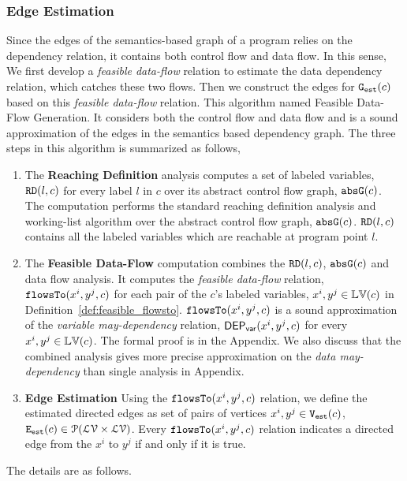 \subsubsection{Edge Estimation}
\label{sec:alg_edgegen}
Since the edges of the semantics-based graph of a program relies on the dependency relation, it contains both control flow and data flow. 
In this sense, We first develop a \emph{feasible data-flow} relation to estimate the data dependency relation, which catches these two flows.
Then we construct the edges for $\mathtt{{G_{est}}}(c)$ based on this \emph{feasible data-flow} relation.
This algorithm named Feasible Data-Flow Generation. It 
considers both the control flow and data flow and
is a sound approximation of the edges in the semantics based dependency graph.
The three steps in this algorithm is summarized as follows,
\begin{enumerate}
  \item The \textbf{Reaching Definition} analysis computes a set of labeled variables, $\mathtt{RD}(l, c)$ for every label $l$ in $c$
  over its abstract control flow graph, $\mathtt{abs}{\mathtt{G}}(c)$.
  The computation performs the standard reaching definition analysis and working-list algorithm over the abstract control flow graph, $\mathtt{abs}{\mathtt{G}}(c)$. 
  $\mathtt{RD}(l, c)$ contains all the labeled variables which are reachable at program point $l$. 
  \item The \textbf{Feasible Data-Flow} computation combines the $\mathtt{RD}(l, c)$, $\mathtt{abs}{\mathtt{G}}(c)$ and data flow analysis. 
  It computes the \emph{feasible data-flow} relation,
  $\mathtt{flowsTo}(x^i, y^j, c)$ for each pair of the $c$'s labeled variables, $x^i, y^j \in \mathbb{LV}(c)$ in Definition~\ref{def:feasible_flowsto}. $\mathtt{flowsTo}(x^i, y^j, c)$ is a sound approximation 
  of the \emph{variable may-dependency} relation, $\mathsf{DEP_{var}}(x^i, y^j, c)$ for every $x^i, y^j \in \mathbb{LV}(c)$.
  The formal proof is in the Appendix. We also discuss that the combined analysis gives more precise approximation on the \emph{data may-dependency} than single analysis in Appendix.
\item \textbf{Edge Estimation}
Using the $\mathtt{flowsTo}(x^i, y^j, c)$ relation, we define the estimated directed edges
as set of pairs of vertices $x^i, y^j\in \mathtt{{V_{est}}}(c)$,
$\mathtt{{E_{est}}}(c) \in \mathcal{P}( \mathcal{LV} \times \mathcal{LV})$.
Every $\mathtt{flowsTo}(x^i, y^j, c)$ relation indicates a directed edge from the $x^i$ to $y^j$ if and only if it is true.
\end{enumerate} 
The details are as follows.
%
